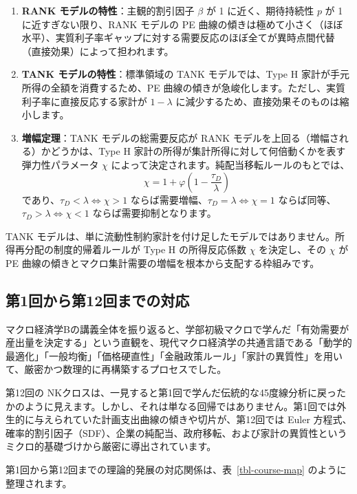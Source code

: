 \documentclass[
  japanese,
  lualatex,
  ja=standard,
  12pt,
  a4paper]{ltjsarticle}
\providecommand{\tightlist}{%
  \setlength{\itemsep}{0pt}\setlength{\parskip}{0pt}}
\begin{document}
\begin{enumerate}
\def\labelenumi{\arabic{enumi}.}
\tightlist
\item
  \textbf{RANK モデルの特性}：主観的割引因子 \(\beta\) が 1
  に近く、期待持続性 \(p\) が 1 に近すぎない限り、RANK モデルの PE
  曲線の傾きは極めて小さく（ほぼ水平）、実質利子率ギャップに対する需要反応のほぼ全てが異時点間代替（直接効果）によって担われます。
\item
  \textbf{TANK モデルの特性}：標準領域の TANK モデルでは、Type H
  家計が手元所得の全額を消費するため、PE
  曲線の傾きが急峻化します。ただし、実質利子率に直接反応する家計が
  \(1-\lambda\) に減少するため、直接効果そのものは縮小します。
\item
  \textbf{増幅定理}：TANK モデルの総需要反応が RANK
  モデルを上回る（増幅される）かどうかは、Type H
  家計の所得が集計所得に対して何倍動くかを表す弾力性パラメータ \(\chi\)
  によって決定されます。純配当移転ルールのもとでは、 \[
  \chi = 1 + \varphi\left( 1 - \frac{\tau_D}{\lambda} \right)
  \] であり、\(\tau_D < \lambda \iff \chi > 1\)
  ならば需要増幅、\(\tau_D = \lambda \iff \chi = 1\)
  ならば同等、\(\tau_D > \lambda \iff \chi < 1\)
  ならば需要抑制となります。
\end{enumerate}

TANK
モデルは、単に流動性制約家計を付け足したモデルではありません。所得再分配の制度的帰着ルールが
Type H の所得反応係数 \(\chi\) を決定し、その \(\chi\) が PE
曲線の傾きとマクロ集計需要の増幅を根本から支配する枠組みです。

\subsection{第1回から第12回までの対応}\label{ux7b2c1ux56deux304bux3089ux7b2c12ux56deux307eux3067ux306eux5bfeux5fdc}

マクロ経済学Bの講義全体を振り返ると、学部初級マクロで学んだ「有効需要が産出量を決定する」という直観を、現代マクロ経済学の共通言語である「動学的最適化」「一般均衡」「価格硬直性」「金融政策ルール」「家計の異質性」を用いて、厳密かつ数理的に再構築するプロセスでした。

第12回の
NKクロスは、一見すると第1回で学んだ伝統的な45度線分析に戻ったかのように見えます。しかし、それは単なる回帰ではありません。第1回では外生的に与えられていた計画支出曲線の傾きや切片が、第12回では
Euler
方程式、確率的割引因子（SDF）、企業の純配当、政府移転、および家計の異質性というミクロ的基礎づけから厳密に導出されています。

第1回から第12回までの理論的発展の対応関係は、表~\ref{tbl-course-map}
のように整理されます。
\end{document}
